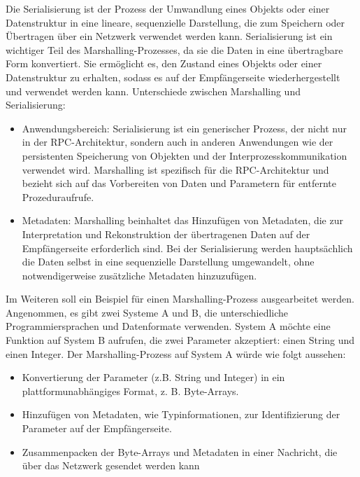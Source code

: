 Die Serialisierung ist der Prozess der Umwandlung eines Objekts oder einer Datenstruktur in eine lineare, sequenzielle Darstellung, die zum Speichern oder Übertragen über ein Netzwerk verwendet werden kann. Serialisierung ist ein wichtiger Teil des Marshalling-Prozesses, da sie die Daten in eine übertragbare Form konvertiert. Sie ermöglicht es, den Zustand eines Objekts oder einer Datenstruktur zu erhalten, sodass es auf der Empfängerseite wiederhergestellt und verwendet werden kann. Unterschiede zwischen Marshalling und Serialisierung:
\begin{itemize} 
\item Anwendungsbereich: Serialisierung ist ein generischer Prozess, der nicht nur in der RPC-Architektur, sondern auch in anderen Anwendungen wie der persistenten Speicherung von Objekten und der Interprozesskommunikation verwendet wird. Marshalling ist spezifisch für die RPC-Architektur und bezieht sich auf das Vorbereiten von Daten und Parametern für entfernte Prozeduraufrufe.
\item Metadaten: Marshalling beinhaltet das Hinzufügen von Metadaten, die zur Interpretation und Rekonstruktion der übertragenen Daten auf der Empfängerseite erforderlich sind. Bei der Serialisierung werden hauptsächlich die Daten selbst in eine sequenzielle Darstellung umgewandelt, ohne notwendigerweise zusätzliche Metadaten hinzuzufügen.
\end{itemize} 
Im Weiteren soll ein Beispiel für einen Marshalling-Prozess ausgearbeitet werden. Angenommen, es gibt zwei Systeme A und B, die unterschiedliche Programmiersprachen und Datenformate verwenden. System A möchte eine Funktion auf System B aufrufen, die zwei Parameter akzeptiert: einen String und einen Integer. Der Marshalling-Prozess auf System A würde wie folgt aussehen:
\begin{itemize} 
\item Konvertierung der Parameter (z.B. String und Integer) in ein plattformunabhängiges Format, z. B. Byte-Arrays.
\item Hinzufügen von Metadaten, wie Typinformationen, zur Identifizierung der Parameter auf der Empfängerseite.
\item Zusammenpacken der Byte-Arrays und Metadaten in einer Nachricht, die über das Netzwerk gesendet werden kann
\end{itemize} 

